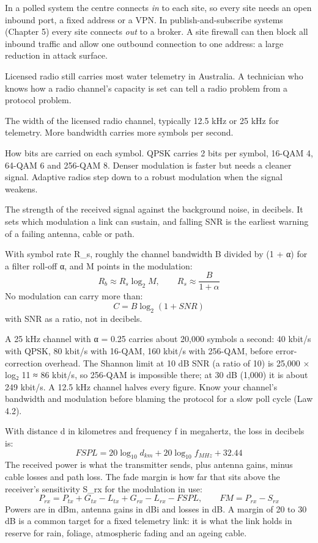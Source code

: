 In a polled system the centre connects \emph{in} to each site, so every site needs an open inbound port, a fixed address or a VPN. In publish-and-subscribe systems (Chapter 5) every site connects \emph{out} to a broker. A site firewall can then block all inbound traffic and allow one outbound connection to one address: a large reduction in attack surface.

Licensed radio still carries most water telemetry in Australia. A technician who knows how a radio channel's capacity is set can tell a radio problem from a protocol problem.

 The width of the licensed radio channel, typically 12.5 kHz or 25 kHz for telemetry. More bandwidth carries more symbols per second.

 How bits are carried on each symbol. QPSK carries 2 bits per symbol, 16-QAM 4, 64-QAM 6 and 256-QAM 8. Denser modulation is faster but needs a cleaner signal. Adaptive radios step down to a robust modulation when the signal weakens.

 The strength of the received signal against the background noise, in decibels. It sets which modulation a link can sustain, and falling SNR is the earliest warning of a failing antenna, cable or path.

 With symbol rate R\_s, roughly the channel bandwidth B divided by (1 + α) for a filter roll-off α, and M points in the modulation:
\[ R_b \approx R_s \log_2 M, \qquad R_s \approx \frac{B}{1 + \alpha} \]
 No modulation can carry more than:
\[ C = B \log_2 (1 + SNR) \]
with SNR as a ratio, not in decibels.

 A 25 kHz channel with α = 0.25 carries about 20,000 symbols a second: 40 kbit/s with QPSK, 80 kbit/s with 16-QAM, 160 kbit/s with 256-QAM, before error-correction overhead. The Shannon limit at 10 dB SNR (a ratio of 10) is 25,000 × log₂ 11 ≈ 86 kbit/s, so 256-QAM is impossible there; at 30 dB (1,000) it is about 249 kbit/s. A 12.5 kHz channel halves every figure. Know your channel's bandwidth and modulation before blaming the protocol for a slow poll cycle (Law 4.2).

 With distance d in kilometres and frequency f in megahertz, the loss in decibels is:
\[ FSPL = 20\log_{10} d_{km} + 20\log_{10} f_{MHz} + 32.44 \]
 The received power is what the transmitter sends, plus antenna gains, minus cable losses and path loss. The fade margin is how far that sits above the receiver's sensitivity S\_rx for the modulation in use:
\[ P_{rx} = P_{tx} + G_{tx} - L_{tx} + G_{rx} - L_{rx} - FSPL, \qquad FM = P_{rx} - S_{rx} \]
Powers are in dBm, antenna gains in dBi and losses in dB. A margin of 20 to 30 dB is a common target for a fixed telemetry link: it is what the link holds in reserve for rain, foliage, atmospheric fading and an ageing cable.


